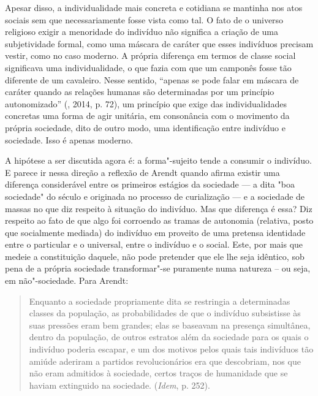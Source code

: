 Apesar disso, a individualidade mais concreta e cotidiana se mantinha
nos atos sociais sem que necessariamente fosse vista como tal. O fato de
o universo religioso exigir a menoridade do indivíduo não significa a
criação de uma subjetividade formal, como uma máscara de caráter que
esses indivíduos precisam vestir, como no caso moderno. A própria
diferença em termos de classe social significava uma individualidade, o
que fazia com que um camponês fosse tão diferente de um cavaleiro. Nesse
sentido, ``apenas se pode falar em máscara de caráter quando as relações
humanas são determinadas por um princípio autonomizado'' (, 2014, p.
72), um princípio que exige das individualidades concretas uma forma de
agir unitária, em consonância com o movimento da própria sociedade, dito
de outro modo, uma identificação entre indivíduo e sociedade. Isso é
apenas moderno.

A hipótese a ser discutida agora é: a
forma"-sujeito tende a consumir o indivíduo. E parece ir nessa direção a
reflexão de Arendt quando afirma existir uma diferença considerável
entre os primeiros estágios da sociedade --- a dita "boa sociedade" do século
 e  originada no processo de curialização ---
e a sociedade de massas no que diz respeito à situação do indivíduo. Mas que
diferença é essa? Diz respeito ao fato de que algo foi corroendo as tramas de
autonomia (relativa, posto que socialmente mediada) do indivíduo em
proveito de uma pretensa identidade entre o particular e o universal,
entre o indivíduo e o social. Este, por mais que medeie a constituição
daquele, não pode pretender que ele lhe seja idêntico, sob pena de a
própria sociedade transformar"-se puramente numa natureza -- ou seja, em
não"-sociedade. Para Arendt:

\begin{quote}
Enquanto a sociedade propriamente dita se restringia a determinadas
classes da população, as probabilidades de que o indivíduo subsistisse
às suas pressões eram bem grandes; elas se baseavam na presença
simultânea, dentro da população, de outros estratos além da sociedade
para os quais o indivíduo poderia escapar, e um dos motivos pelos quais
tais indivíduos tão amiúde aderiram a partidos revolucionários era que
descobriam, nos que não eram admitidos à sociedade, certos traços de
humanidade que se haviam extinguido na sociedade. (\emph{Idem}, p. 252).
\end{quote}


